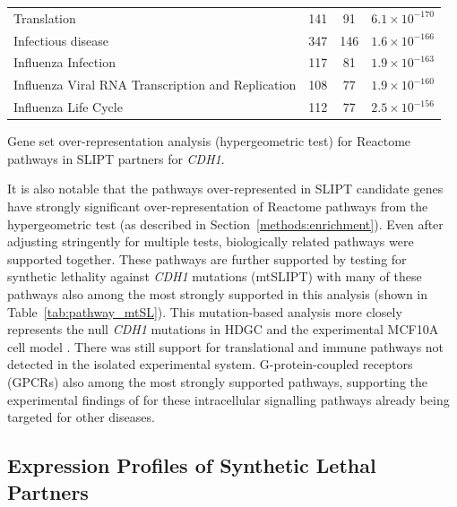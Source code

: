 \begin{table}[!ht]
{\begin{threeparttable}
\begin{tabular}{lccc}
  \rowcolor{black!5}
  Translation & 141 &  91 & $6.1 \times 10^{-170}$ \\ 
  \rowcolor{black!10}
  Infectious disease & 347 & 146 & $1.6 \times 10^{-166}$ \\ 
  \rowcolor{black!5}
  Influenza Infection & 117 &  81 & $1.9 \times 10^{-163}$ \\ 
  \rowcolor{black!10}
  Influenza Viral RNA Transcription and Replication & 108 &  77 & $1.9 \times 10^{-160}$ \\ 
  \rowcolor{black!5}
  Influenza Life Cycle & 112 &  77 & $2.5 \times 10^{-156}$ \\ 
   \hline
\end{tabular}
\begin{tablenotes}
\raggedright \small
Gene set over-representation analysis (hypergeometric test) for Reactome pathways in \gls{SLIPT} partners for \textit{CDH1}.
\end{tablenotes}
\end{threeparttable}
}
\end{table}

It is also notable that the pathways over-represented in \gls{SLIPT} candidate genes have strongly significant over-representation of Reactome pathways from the hypergeometric test (as described in Section~\ref{methods:enrichment}). Even after adjusting stringently for multiple tests, biologically related pathways were supported together. These pathways are further supported by testing for synthetic lethality against \textit{CDH1} mutations (mtSLIPT) with many of these pathways also among the most strongly supported in this analysis (shown in Table~\ref{tab:pathway_mtSL}). This mutation-based analysis more closely represents the null \textit{CDH1} mutations in HDGC \citep{Guilford1998} and the experimental MCF10A cell model \citep{Chen2014}. There was still support for translational and immune pathways not detected in the isolated experimental system.  G-protein-coupled receptors (GPCRs) also among the most strongly supported pathways, supporting the experimental findings of \citet{Telford2015} for these intracellular signalling pathways already being targeted for other diseases. 


\FloatBarrier


\subsection{Expression Profiles of Synthetic Lethal Partners} \label{chapt3:exprSL_clusters}

